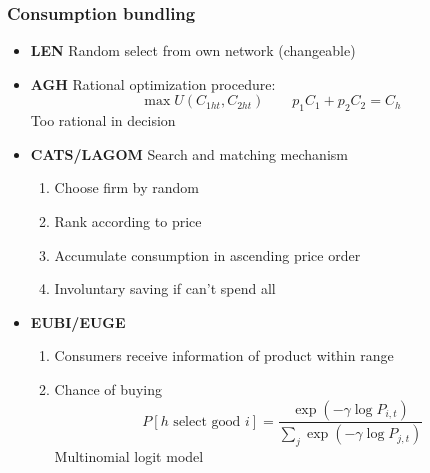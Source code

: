 \begin{frame}
    \frametitle{Consumption bundling}

    \begin{itemize}
        \item<+-> \textbf{LEN} Random select from own network (changeable)
        \item<+-> \textbf{AGH} Rational optimization procedure: 
        \begin{equation*}
            \max U(C_{1ht}, C_{2ht}) \qquad p_1 C_1 + p_2 C_2 = C_h
        \end{equation*}
        Too rational in decision 
        \item<+-> \textbf{CATS/LAGOM} Search and matching mechanism
        \begin{enumerate}
            \item Choose firm by random
            \item Rank according to price 
            \item Accumulate consumption in ascending price order 
            \item Involuntary saving if can't spend all 
        \end{enumerate}
        \item<+-> \textbf{EUBI/EUGE}
        \begin{enumerate}
            \item Consumers receive information of product within range
            \item Chance of buying
            \begin{equation*}
                P[h \text{ select good }i] = \frac{\exp(-\gamma \log P_{i,t})}{\sum_j \exp(-\gamma \log P_{j,t})}
            \end{equation*}
            Multinomial logit model
        \end{enumerate}
    \end{itemize}


    

\end{frame}